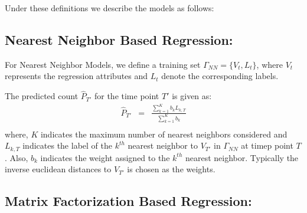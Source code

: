 Under these definitions we describe the models as follows:

\subsection{\label{sec:model:nearestneighbor} Nearest Neighbor Based
Regression:}
For Nearest Neighbor Models, we define a training set $\Gamma_{NN}
= \lbrace V_t, L_t \rbrace$, where $V_t$ represents the regression attributes
and $L_t$ denote the corresponding labels. 

The predicted count $\widehat{P}_{T'}$ for the time point $T'$ is given as:
\begin{equation} \label{eq:nearestneighbor:pred}
  \begin{array}{lcl}
  \widehat{P}_{T'} & = & \frac{\sum\limits_{k=1}^{K} b_{k}L_{k,T}}{\sum\limits_{k=1}^{K} b_{k}}\\
  \end{array}
\end{equation}
where, $K$ indicates the maximum number of nearest neighbors considered
and $L_{k,T}$ indicates the label of the $k^{th}$ nearest neighbor to $V_{T'}$ in $\Gamma_{NN}$
at timep point $T$. Also, $b_k$ indicates the weight assigned to the $k^{th}$ nearest neighbor.
Typically the inverse euclidean distances to $V_{T'}$ is chosen as the weights.

\subsection{\label{sec:model:matrixfactor} Matrix Factorization Based
Regression:}

